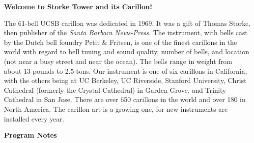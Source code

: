 \documentclass[11pt, letterpaper]{article}
\begin{document}
\hrulefill

\textbf{\small Welcome to Storke Tower and its Carillon!}

{\footnotesize
    The 61-bell UCSB carillon was dedicated in 1969. It was a gift of Thomas Storke, then publisher of the \textit{Santa Barbara News-Press}. The instrument, with bells cast by the Dutch bell foundry Petit \& Fritsen, is one of the finest carillons in the world with regard to bell tuning and sound quality, number of bells, and location (not near a busy street and near the ocean). The bells range in weight from about 13 pounds to 2.5 tons.
    Our instrument is one of six carillons in California, with the others being at UC Berkeley, UC Riverside, Stanford University, Christ Cathedral (formerly the Crystal Cathedral) in Garden Grove, and Trinity Cathedral in San Jose. There are over 650 carillons in the world and over 180 in North America. The carillon art is a growing one, for new instruments are installed every year. \par
}

\vfill
{}

\vfill

\newpage

\textbf{Program Notes}
\end{document}
